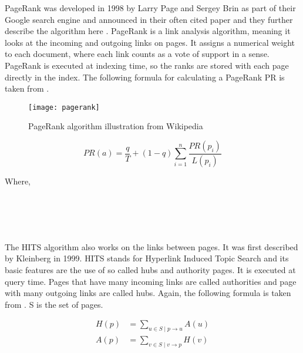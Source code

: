 PageRank was developed in 1998 by Larry Page and Sergey Brin as part of their Google search engine and announced in their often cited paper \autocite{Brin1998b} and they further describe the algorithm here \autocite{Brin1998}. PageRank is a link analysis algorithm, meaning it looks at the incoming and outgoing links on pages. It assigns a numerical weight to each document, where each link counts as a vote of support in a sense. PageRank is executed at indexing time, so the ranks are stored with each page directly in the index. The following formula for calculating a PageRank PR is taken from \autocite[p.472]{Baeza-Yates2011}.

\begin{figure}[!htbp] %
  \centering
  \texttt{[image: pagerank]}
\caption[PageRank algorithm]{PageRank algorithm illustration from Wikipedia}
\label{fig:pagerank2}
\end{figure}

\begin{equation}
  PR(a) =
  \frac{q}{T} + (1 - q)
  \sum_{i=1}^{n} \frac{PR(p_i)}{L(p_i)}
  \label{eq:PRt}
\end{equation}

Where,\\
 \\
 \\
 \\
 \\
\itab{} 

The HITS algorithm also works on the links between pages. It was first described by Kleinberg \autocite[p.472]{Kleinberg1999, Kleinberg} in 1999. HITS stands for Hyperlink Induced Topic Search and its basic features are the use of so called hubs and authority pages. It is executed at query time. Pages that have many incoming links are called authorities and page with many outgoing links are called hubs. Again, the following formula is taken from \autocite[p.471]{Baeza-Yates2011}. S is the set of pages.

\begin{equation}
  \begin{split}
  H(p) &= \sum_{u\in S \mid p\to u}A(u)\\
  A(p) &= \sum_{v\in S \mid v\to p}H(v)
  \end{split}
  \label{eq:HITS}
\end{equation}

